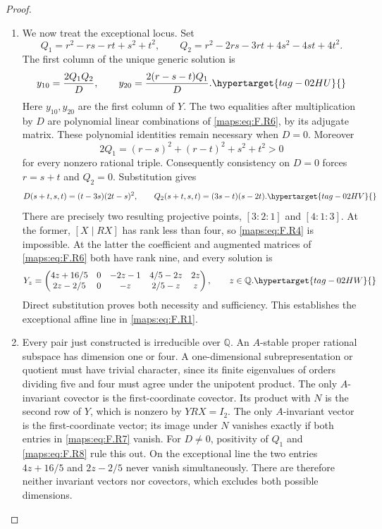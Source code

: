 \documentclass[11pt,a4paper]{article}
\numberwithin{equation}{section}
\theoremstyle{definition}
\begin{document}
\begin{proof}
\begin{enumerate}[label=\arabic*.]
\item We now treat the exceptional locus.
Set
\[
 Q_1=r^2-rs-rt+s^2+t^2,
 \qquad Q_2=r^2-2rs-3rt+4s^2-4st+4t^2.
\]
The first column of the unique generic solution is
\begin{equation}
 y_{10}=\frac{2Q_1Q_2}{D},\qquad
 y_{20}=\frac{2(r-s-t)Q_1}{D}.
 \hypertarget{tag-02HU}{}\label{maps:eq:F.R7}
\end{equation}
Here $y_{10},y_{20}$ are the first column of $Y$.
The two equalities after multiplication by $D$ are polynomial
linear combinations of \eqref{maps:eq:F.R6}, by its adjugate matrix.
These polynomial identities remain necessary when $D=0$.
Moreover
\[
 2Q_1=(r-s)^2+(r-t)^2+s^2+t^2>0
\]
for every nonzero rational triple.  Consequently consistency
on $D=0$ forces $r=s+t$ and $Q_2=0$.
Substitution gives
\begin{equation}
 D(s+t,s,t)=(t-3s)(2t-s)^2,
 \qquad Q_2(s+t,s,t)=(3s-t)(s-2t).
 \hypertarget{tag-02HV}{}\label{maps:eq:F.R8}
\end{equation}
There are precisely two resulting projective points,
$[3:2:1]$ and $[4:1:3]$.
At the former, $[X\mid RX]$ has rank less than four, so
\eqref{maps:eq:F.R4} is impossible.  At the latter the coefficient and
augmented matrices of \eqref{maps:eq:F.R6} both have rank nine, and every
solution is
\begin{equation}
 Y_z=\begin{pmatrix}
 4z+16/5&0&-2z-1&4/5-2z&2z\\
 2z-2/5&0&-z&2/5-z&z
 \end{pmatrix},\qquad z\in\mathbb Q.
 \hypertarget{tag-02HW}{}\label{maps:eq:F.R9}
\end{equation}
Direct substitution proves both necessity and sufficiency.
This establishes the exceptional affine line in \eqref{maps:eq:F.R1}.

\item Every pair just constructed is irreducible over $\mathbb Q$.
An $A$-stable proper rational subspace has dimension one or
four.  A one-dimensional subrepresentation or quotient must
have trivial character, since its finite eigenvalues of
orders dividing five and four must agree under the
unipotent product.  The only $A$-invariant covector is the
first-coordinate covector.  Its product with $N$ is the
second row of $Y$, which is nonzero by $YRX=I_2$.
The only $A$-invariant vector is the first-coordinate vector;
its image under $N$ vanishes exactly if both entries in
\eqref{maps:eq:F.R7} vanish.  For $D\ne0$, positivity of $Q_1$ and
\eqref{maps:eq:F.R8} rule this out.  On the exceptional line the two
entries $4z+16/5$ and $2z-2/5$ never vanish simultaneously.
There are therefore neither invariant vectors nor covectors,
which excludes both possible dimensions.


\end{enumerate}
\end{proof}
\end{document}
